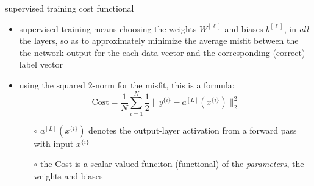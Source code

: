 \documentclass[xcolor={svgnames},
               hyperref={colorlinks,citecolor=DeepPink4,linkcolor=FireBrick,urlcolor=Maroon}]
               {beamer}
\begin{document}
\begin{frame}{supervised training cost functional}

\begin{itemize}
\item \alert{supervised training} means choosing the weights $W^{[\ell]}$ and biases $b^{[\ell]}$, in \emph{all} the layers, so as to approximately minimize the \alert{average misfit} between the the network output for the each data vector and the corresponding (\alert{correct}) label vector
\item using the squared $2$-norm for the misfit, this is a formula:
    $$\text{Cost} = \frac{1}{N} \sum_{i=1}^N \frac{1}{2} \|y^{\{i\}} - a^{[L]}(x^{\{i\}})\|_2^2$$

    \begin{itemize}
    \item[$\circ$] $a^{[L]}(x^{\{i\}})$ denotes the output-layer activation from a forward pass with input $x^{\{i\}}$
    \item[$\circ$] the Cost is a scalar-valued funciton (\alert{functional}) of the \emph{parameters}, the weights and biases
    \end{itemize}
\end{itemize}
\end{frame}
\end{document}
